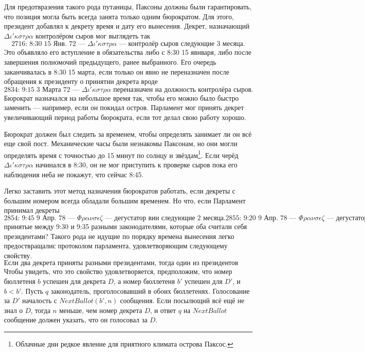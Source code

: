 \documentclass[12pt, a4paper]{article} %
\begin{document}
Для предотвразения такого рода путаницы, Паксоны должны были гарантировать, что позиция могла быть всегда занята только одним бюрократом. Для этого, президент добавлял к декрету время и дату его вынесения. Декрет, назначающий $\Delta\iota'\kappa\sigma\tau\rho\alpha$ контролёром сыров мог выглядеть так
\[
    \mbox{2716: 8:30 15 Янв. 72 --- $\Delta\iota'\kappa\sigma\tau\rho\alpha$ --- контролёр сыров следующие 3 месяца.}
\]
Это объявляло его вступление в обязательства либо с 8:30 15 явнваря, либо после завершения полномочий предыдущего, ранее выбранного. Его очередь заканчивалась в 8:30 15 марта, если только он явно не переназначен после обращения к президенту о принятии декрета вроде
\[
    \mbox{2834: 9:15 3 Марта 72 --- $\Delta\iota'\kappa\sigma\tau\rho\alpha$ переназначен на должность контролёра сыров.}
\]
Бюрократ назначался на небольшое время так, чтобы его можно было быстро заменить --- например, если он покидал остров. Парламент мог принять декрет увеличивающий период работы бюрократа, если тот делал свою работу хорошо.

Бюрократ должен был следить за временем, чтобы определять занимает ли он всё еще свой пост. Механические часы были незнакомы Паксонам, но они могли определять время с точностью до 15 минут по солнцу и звёздам\footnote{Облачные дни редкое явление для приятного климата острова Паксос.}. Если черёд $\Delta\iota'\kappa\sigma\tau\rho\alpha$ начинался в 8:30, он не мог приступить к проверке сыров пока его наблюдения неба не покажут, что сейчас 8:45.

Легко заставить этот метод назначения бюрократов работать, если декреты с большим номером всегда обладали большим временем. Но что, если Парламент принимал декреты
\[
    \mbox{2854: 9:45 9 Апр. 78 --- $\Phi\rho\alpha\nu\sigma\epsilon\zeta$ --- дегустатор вин следующие 2 месяца.}
    \mbox{2855: 9:20 9 Апр. 78 --- $\Phi\rho\alpha\nu\sigma\epsilon\zeta$ --- дегустатор вин следующий месяц.}
\]
принятые между 9:30 и 9:35 разными законодателями, которые оба считали себя президентами? Такого рода не идущие по порядку времена вынесения легко предоствращалис протоколом парламента, удовлетворяющим следующему свойству.
\[
    \mbox{Если два декрета приняты разными президентами, тогда один из президентов предлагает свой декрет после того, как узнает, что другой президент предложил свой.}
\]
Чтобы увидеть, что это свойство удовлетворяется, предположим, что номер бюллетеня $b$ успешен для декрета $D$, а номер бюллетеня $b'$ успешен для $D'$, и $b < b'$. Пусть $q$ законодатель, проголосовавший в обоих бюллетенях. Голосование за $D'$ началость с $NextBallot(b', n)$ сообщения. Если посылющий всё ещё не знал о $D$, тогда $n$ меньше, чем номер декрета $D$, и ответ $q$ на $NextBallot$ сообщение должен указать, что он голосовал за $D$.
\end{document}
